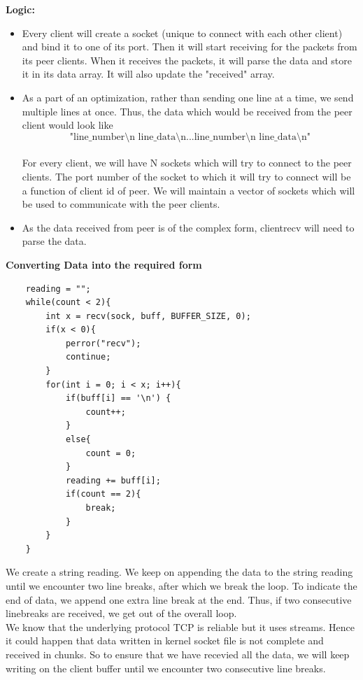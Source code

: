 \documentclass[12pt]{scrartcl}
\begin{document}
\textbf{Logic:}
\begin{itemize}
    \item Every client will create a socket (unique to connect with each other client) and bind it to one of its port. Then it will start receiving for the packets from its peer clients. When it receives the packets, it will parse the data and store it in its data array. It will also update the "received" array. 
    \item As a part of an optimization, rather than sending one line at a time, we send multiple lines at once. Thus, the data which would be received from the peer client would look like \[\mbox{"line\_number\textbackslash n line\_data\textbackslash n...line\_number\textbackslash n line\_data\textbackslash n"}\]\\ 
    For every client, we will have N sockets which will try to connect to the peer clients. The port number of the socket to which it will try to connect will be a function of client id of peer. We will maintain a vector of sockets which will be used to communicate with the peer clients.
    \item As the data received from peer is of the complex form, clientrecv will need to parse the data.
\end{itemize}

\textbf{Converting Data into the required form}
\begin{verbatim}
    reading = "";
    while(count < 2){
        int x = recv(sock, buff, BUFFER_SIZE, 0);
        if(x < 0){
            perror("recv");
            continue;
        }
        for(int i = 0; i < x; i++){
            if(buff[i] == '\n') {
                count++;
            }
            else{
                count = 0;
            }
            reading += buff[i];
            if(count == 2){
                break;
            }
        }
    }
\end{verbatim}
\par We create a string reading. We keep on appending the data to the string reading until we encounter two line breaks, after which we break the loop. To indicate the end of data, we append one extra line break at the end. Thus, if two consecutive linebreaks are received, we get out of the overall loop.\\

We know that the underlying protocol TCP is reliable but it uses streams. Hence it could happen that data written in kernel socket file is not complete and received in chunks. So to ensure that we have recevied all the data, we will keep writing on the client buffer until we encounter two consecutive line breaks.\\
\end{document}
